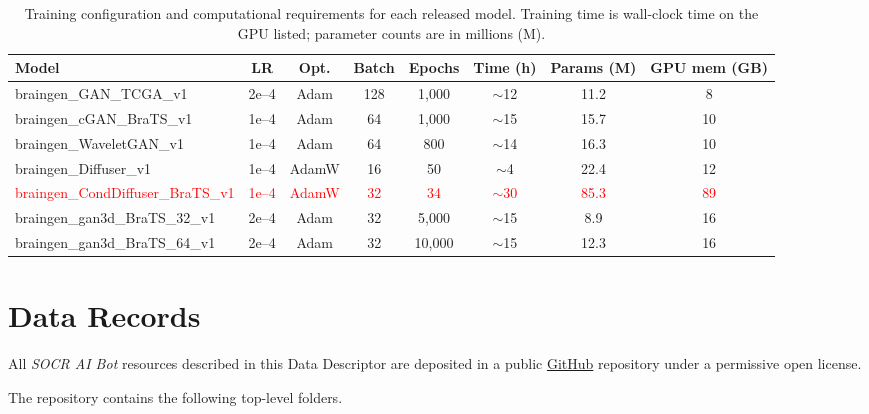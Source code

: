 \documentclass[11pt]{article}
\begin{document}
\begin{table}[!t]
\centering
\footnotesize
\caption{Training configuration and computational requirements for each released model. Training time is wall-clock time on the GPU listed; parameter counts are in millions (M).}
\label{tab:training_config}
\setlength{\tabcolsep}{3pt}
\begin{tabular}{lccccccc}
\toprule
\textbf{Model} & \textbf{LR} & \textbf{Opt.} & \textbf{Batch} & \textbf{Epochs} & \textbf{Time (h)} & \textbf{Params (M)} & \textbf{GPU mem (GB)} \\
\midrule
braingen\_GAN\_TCGA\_v1        & 2e--4 & Adam  & 128 & 1{,}000  & $\sim$12 & 11.2 & 8 \\
braingen\_cGAN\_BraTS\_v1      & 1e--4 & Adam  & 64  & 1{,}000  & $\sim$15 & 15.7 & 10 \\
braingen\_WaveletGAN\_v1       & 1e--4 & Adam  & 64  & 800    & $\sim$14 & 16.3 & 10 \\
braingen\_Diffuser\_v1         & 1e--4 & AdamW & 16  & 50     & $\sim$4  & 22.4 & 12 \\
\textcolor{red}{braingen\_CondDiffuser\_BraTS\_v1} & \textcolor{red}{1e--4} & \textcolor{red}{AdamW} & \textcolor{red}{32} & \textcolor{red}{34} & \textcolor{red}{$\sim$30} & \textcolor{red}{85.3} & \textcolor{red}{89} \\
braingen\_gan3d\_BraTS\_32\_v1 & 2e--4 & Adam  & 32  & 5{,}000  & $\sim$15 & 8.9  & 16 \\
braingen\_gan3d\_BraTS\_64\_v1 & 2e--4 & Adam  & 32  & 10{,}000 & $\sim$15 & 12.3 & 16 \\
\bottomrule
\end{tabular}
\end{table}

\section*{Data Records}
\label{sec:datarecords}

All \emph{SOCR AI Bot} resources described in this Data Descriptor are deposited in a public
\href{https://github.com/SOCR/Brain-Image-Generator}{GitHub}
repository under a permissive open license.

The repository contains the following top-level folders.
\end{document}
